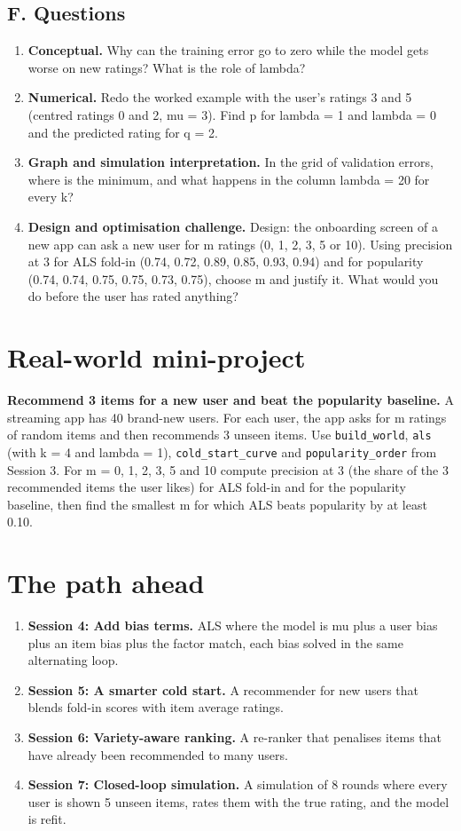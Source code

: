 \documentclass[11pt,a4paper]{article}
\begin{document}
\subsection*{F. Questions}
\begin{enumerate}[nosep]
\item \textbf{Conceptual.} Why can the training error go to zero while the model gets worse on new ratings? What is the role of lambda?
\item \textbf{Numerical.} Redo the worked example with the user's ratings 3 and 5 (centred ratings 0 and 2, mu = 3). Find p for lambda = 1 and lambda = 0 and the predicted rating for q = 2.
\item \textbf{Graph and simulation interpretation.} In the grid of validation errors, where is the minimum, and what happens in the column lambda = 20 for every k?
\item \textbf{Design and optimisation challenge.} Design: the onboarding screen of a new app can ask a new user for m ratings (0, 1, 2, 3, 5 or 10). Using precision at 3 for ALS fold-in (0.74, 0.72, 0.89, 0.85, 0.93, 0.94) and for popularity (0.74, 0.74, 0.75, 0.75, 0.73, 0.75), choose m and justify it. What would you do before the user has rated anything?
\end{enumerate}

\section{Real-world mini-project}
\textbf{Recommend 3 items for a new user and beat the popularity baseline.} A streaming app has 40 brand-new users. For each user, the app asks for m ratings of random items and then recommends 3 unseen items. Use \texttt{build\_world}, \texttt{als} (with k = 4 and lambda = 1), \texttt{cold\_start\_curve} and \texttt{popularity\_order} from Session 3. For m = 0, 1, 2, 3, 5 and 10 compute precision at 3 (the share of the 3 recommended items the user likes) for ALS fold-in and for the popularity baseline, then find the smallest m for which ALS beats popularity by at least 0.10.

\section{The path ahead}
\begin{enumerate}[nosep]
\item \textbf{Session 4: Add bias terms.} ALS where the model is mu plus a user bias plus an item bias plus the factor match, each bias solved in the same alternating loop.
\item \textbf{Session 5: A smarter cold start.} A recommender for new users that blends fold-in scores with item average ratings.
\item \textbf{Session 6: Variety-aware ranking.} A re-ranker that penalises items that have already been recommended to many users.
\item \textbf{Session 7: Closed-loop simulation.} A simulation of 8 rounds where every user is shown 5 unseen items, rates them with the true rating, and the model is refit.
\end{enumerate}
\end{document}

